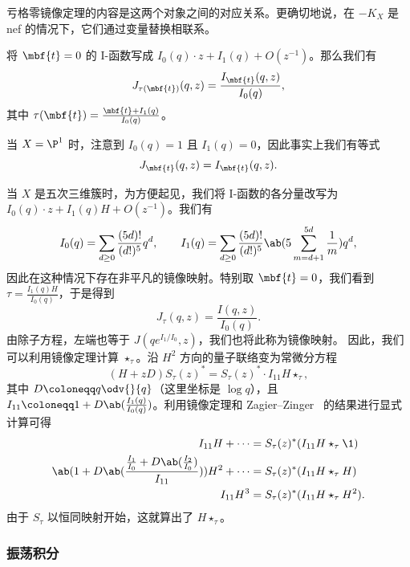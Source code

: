 亏格零镜像定理的内容是这两个对象之间的对应关系。更确切地说，在 \(-K_X\) 是 nef 的情况下，它们通过变量替换相联系。

\begin{thm}
    将 \(\mbf{t} = 0\) 的 I-函数写成 \(I_0(q) \cdot z + I_1(q) + O(z^{-1})\)。那么我们有
    \[
        J_{\tau(\mbf{t})}(q,z) = \frac{I_{\mbf{t}}(q,z)}{I_0(q)},
    \]
    其中 \(\tau(\mbf{t}) = \frac{\mbf{t} + I_1(q)}{I_0(q)}\)。
\end{thm}

\begin{exm}
    当 \(X = \P^1\) 时，注意到 \(I_0(q) = 1\) 且 \(I_1(q) = 0\)，因此事实上我们有等式
    \[ J_{\mbf{t}}(q,z) = I_{\mbf{t}}(q,z). \]
\end{exm}

\begin{exm}
    当 \(X\) 是五次三维簇时，为方便起见，我们将 I-函数的各分量改写为 \(I_0(q) \cdot z + I_1(q)H + O(z^{-1})\)。我们有
    \[ I_0(q) = \sum_{d \geq 0} \frac{(5d)!}{(d!)^5} q^d, \qquad I_1(q) = \sum_{d \geq 0} \frac{(5d)!}{(d!)^5} \ab(5\sum_{m=d+1}^{5d} \frac{1}{m}) q^d, \]
    因此在这种情况下存在非平凡的镜像映射。特别取 \(\mbf{t} = 0\)，我们看到 \(\tau = \frac{I_1(q)H}{I_0(q)}\)，于是得到
    \[ J_{\tau}(q,z) = \frac{I(q,z)}{I_0(q)}. \]
    由除子方程，左端也等于 \(J(qe^{I_1/I_0}, z)\)，我们也将此称为镜像映射。
    因此，我们可以利用镜像定理计算 $\star_{\tau}$。沿 \(H^2\) 方向的量子联络变为常微分方程
    \[ (H+zD) S_{\tau}(z)^* = S_{\tau}(z)^* \cdot I_{11} H \star_{\tau}, \]
    其中 $D \coloneqq q \odv{}{q}$（这里坐标是 $\log q$），且 $I_{11} \coloneqq 1 + D \ab(\frac{I_1(q)}{I_0(q)})$。利用镜像定理和 Zagier--Zinger~\cite{ZagierZinger2008} 的结果进行显式计算可得
    \begin{align*}
        I_{11} H + \cdots &= S_{\tau}(z)^* (I_{11} H \star_{\tau} \1) \\
        \ab( 1 + D\ab(\frac{\frac{I_1}{I_0} + D \ab(\frac{I_2}{I_0})}{I_{11}}) ) H^2 + \cdots &= S_{\tau}(z)^* (I_{11} H \star_{\tau} H) \\
        I_{11} H^3 &= S_{\tau}(z)^* (I_{11}H \star_{\tau} H^2).
    \end{align*}
    由于 $S_{\tau}$ 以恒同映射开始，这就算出了 $H \star_{\tau}$。
\end{exm}

\subsubsection{振荡积分}%
\label{ssub:Oscillating integrals}

